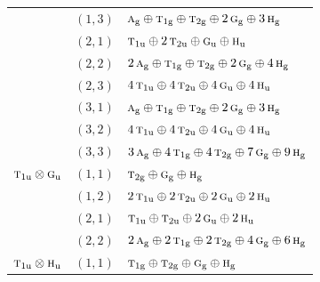 \documentclass[11pt]{article}
\newcommand{\irr}[1]{\text{\normalfont\scshape #1}}
\newcommand{\ptag}[1]{\mathrm{#1}}
\begin{document}
\begin{longtable}{p{} c p{}}
 & $(1,3)$ & $\irr{a}_{\ptag{g}}\oplus \irr{t}_{1\ptag{g}}\oplus \irr{t}_{2\ptag{g}}\oplus 2\,\irr{g}_{\ptag{g}}\oplus 3\,\irr{h}_{\ptag{g}}$\\

 & $(2,1)$ & $\irr{t}_{1\ptag{u}}\oplus 2\,\irr{t}_{2\ptag{u}}\oplus \irr{g}_{\ptag{u}}\oplus \irr{h}_{\ptag{u}}$\\

 & $(2,2)$ & $2\,\irr{a}_{\ptag{g}}\oplus \irr{t}_{1\ptag{g}}\oplus \irr{t}_{2\ptag{g}}\oplus 2\,\irr{g}_{\ptag{g}}\oplus 4\,\irr{h}_{\ptag{g}}$\\

 & $(2,3)$ & $4\,\irr{t}_{1\ptag{u}}\oplus 4\,\irr{t}_{2\ptag{u}}\oplus 4\,\irr{g}_{\ptag{u}}\oplus 4\,\irr{h}_{\ptag{u}}$\\

 & $(3,1)$ & $\irr{a}_{\ptag{g}}\oplus \irr{t}_{1\ptag{g}}\oplus \irr{t}_{2\ptag{g}}\oplus 2\,\irr{g}_{\ptag{g}}\oplus 3\,\irr{h}_{\ptag{g}}$\\

 & $(3,2)$ & $4\,\irr{t}_{1\ptag{u}}\oplus 4\,\irr{t}_{2\ptag{u}}\oplus 4\,\irr{g}_{\ptag{u}}\oplus 4\,\irr{h}_{\ptag{u}}$\\

 & $(3,3)$ & $3\,\irr{a}_{\ptag{g}}\oplus 4\,\irr{t}_{1\ptag{g}}\oplus 4\,\irr{t}_{2\ptag{g}}\oplus 7\,\irr{g}_{\ptag{g}}\oplus 9\,\irr{h}_{\ptag{g}}$\\

\hline

$\irr{t}_{1\ptag{u}}\otimes \irr{g}_{\ptag{u}}$ & $(1,1)$ & $\irr{t}_{2\ptag{g}}\oplus \irr{g}_{\ptag{g}}\oplus \irr{h}_{\ptag{g}}$\\

 & $(1,2)$ & $2\,\irr{t}_{1\ptag{u}}\oplus 2\,\irr{t}_{2\ptag{u}}\oplus 2\,\irr{g}_{\ptag{u}}\oplus 2\,\irr{h}_{\ptag{u}}$\\

 & $(2,1)$ & $\irr{t}_{1\ptag{u}}\oplus \irr{t}_{2\ptag{u}}\oplus 2\,\irr{g}_{\ptag{u}}\oplus 2\,\irr{h}_{\ptag{u}}$\\

 & $(2,2)$ & $2\,\irr{a}_{\ptag{g}}\oplus 2\,\irr{t}_{1\ptag{g}}\oplus 2\,\irr{t}_{2\ptag{g}}\oplus 4\,\irr{g}_{\ptag{g}}\oplus 6\,\irr{h}_{\ptag{g}}$\\

\hline

$\irr{t}_{1\ptag{u}}\otimes \irr{h}_{\ptag{u}}$ & $(1,1)$ & $\irr{t}_{1\ptag{g}}\oplus \irr{t}_{2\ptag{g}}\oplus \irr{g}_{\ptag{g}}\oplus \irr{h}_{\ptag{g}}$\\


\end{longtable}
\end{document}
